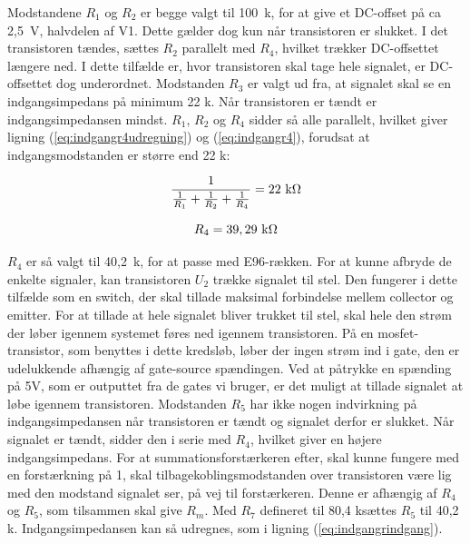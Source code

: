 Modstandene $R_1$ og $R_2$ er begge valgt til 100~k\ohm, for at give et DC-offset på ca 2,5~V, halvdelen af V1. Dette gælder dog kun når transistoren er slukket. I det transistoren tændes, sættes $R_2$ parallelt med $R_4$, hvilket trækker DC-offsettet længere ned.
I dette tilfælde er, hvor transistoren skal tage hele signalet, er DC-offsettet dog underordnet. 
Modstanden $R_3$ er valgt ud fra, at signalet skal se en indgangsimpedans på minimum 22 k\ohm. Når transistoren er tændt er indgangsimpedansen mindst. $R_1$, $R_2$ og $R_4$ sidder så alle parallelt, hvilket giver ligning (\ref{eq:indgangr4udregning}) og (\ref{eq:indgangr4}), forudsat at indgangsmodstanden er større end 22 k\ohm:

\begin{equation}
\label{eq:indgangr4udregning}
\frac{1}{\frac{1}{R_1}+\frac{1}{R_2}+\frac{1}{R_4}}=22~\mathrm{k}\ohm
\end{equation}

\begin{equation}
\label{eq:indgangr4}
R_4=39,29~\mathrm{k}\ohm
\end{equation}

$R_4$ er så valgt til 40,2~k\ohm, for at passe med E96-rækken.
For at kunne afbryde de enkelte signaler, kan transistoren $U_2$ trække signalet til stel. Den fungerer i dette tilfælde som en switch, der skal tillade maksimal forbindelse mellem collector og emitter. For at tillade at hele signalet bliver trukket til stel, skal hele den strøm der løber igennem systemet føres ned igennem transistoren. På en mosfet-transistor, som benyttes i dette kredsløb, løber der ingen strøm ind i gate, den er udelukkende afhængig af gate-source spændingen. Ved at påtrykke en spænding på 5V, som er outputtet fra de gates vi bruger, er det muligt at tillade signalet at løbe igennem transistoren.
Modstanden $R_5$ har ikke nogen indvirkning på indgangsimpedansen når transistoren er tændt og signalet derfor er slukket. Når signalet er tændt, sidder den i serie med $R_4$, hvilket giver en højere indgangsimpedans. For at summationsforstærkeren efter, skal kunne fungere med en forstærkning på 1, skal tilbagekoblingsmodstanden over transistoren være lig med den modstand signalet ser, på vej til forstærkeren. Denne er afhængig af $R_4$ og $R_5$, som tilsammen skal give $R_m$. Med $R_7$ defineret til 80,4 k\ohm sættes $R_5$ til 40,2 k\ohm . Indgangsimpedansen kan så udregnes, som i ligning (\ref{eq:indgangrindgang}).

